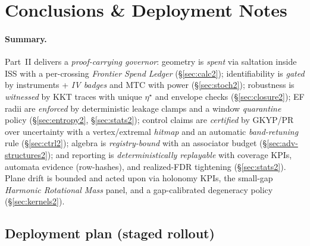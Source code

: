 \section{Conclusions \& Deployment Notes}\label{sec:conclusion2}

\paragraph{Summary.}
Part~II delivers a \emph{proof-carrying governor}: geometry is \emph{spent} via saltation inside ISS with a per-crossing \emph{Frontier Spend Ledger} (\S\ref{sec:calc2}); identifiability is \emph{gated} by instruments + \emph{IV badges} and MTC with power (\S\ref{sec:stoch2}); robustness is \emph{witnessed} by KKT traces with unique $\eta^\star$ and envelope checks (\S\ref{sec:closure2}); EF radii are \emph{enforced} by deterministic leakage clamps and a window \emph{quarantine} policy (\S\ref{sec:entropy2}, \S\ref{sec:stats2}); control claims are \emph{certified} by GKYP/PR over uncertainty with a vertex/extremal \emph{hitmap} and an automatic \emph{band-retuning} rule (\S\ref{sec:ctrl2}); algebra is \emph{registry-bound} with an associator budget (\S\ref{sec:adv-structures2}); and reporting is \emph{deterministically replayable} with coverage KPIs, automata evidence (row-hashes), and realized-FDR tightening (\S\ref{sec:stats2}). Plane drift is bounded and acted upon via holonomy KPIs, the small-gap \emph{Harmonic Rotational Mass} panel, and a gap-calibrated degeneracy policy (\S\ref{sec:kernels2}).

\subsection*{Deployment plan (staged rollout)}

